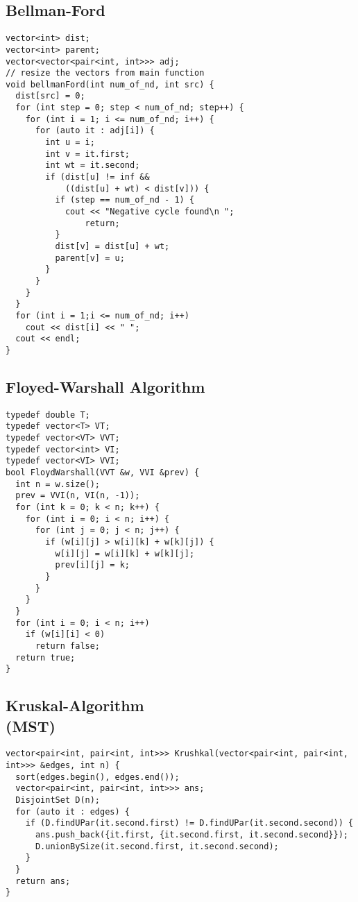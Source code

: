 \documentclass[10pt, a4paper]{article}
\begin{document}
\begin{multicols}{2}
\subsection{Bellman-Ford}
\begin{lstlisting}
vector<int> dist;
vector<int> parent;
vector<vector<pair<int, int>>> adj;
// resize the vectors from main function
void bellmanFord(int num_of_nd, int src) {
  dist[src] = 0;
  for (int step = 0; step < num_of_nd; step++) {
    for (int i = 1; i <= num_of_nd; i++) {
      for (auto it : adj[i]) {
        int u = i;
        int v = it.first;
        int wt = it.second;
        if (dist[u] != inf &&
            ((dist[u] + wt) < dist[v])) {
          if (step == num_of_nd - 1) {
            cout << "Negative cycle found\n ";
                return;
          }
          dist[v] = dist[u] + wt;
          parent[v] = u;
        }
      }
    }
  }
  for (int i = 1;i <= num_of_nd; i++)
    cout << dist[i] << " ";
  cout << endl;
}
\end{lstlisting}
\subsection{Floyed-Warshall Algorithm}
\begin{lstlisting}
typedef double T;
typedef vector<T> VT;
typedef vector<VT> VVT;
typedef vector<int> VI;
typedef vector<VI> VVI;
bool FloydWarshall(VVT &w, VVI &prev) {
  int n = w.size();
  prev = VVI(n, VI(n, -1));
  for (int k = 0; k < n; k++) {
    for (int i = 0; i < n; i++) {
      for (int j = 0; j < n; j++) {
        if (w[i][j] > w[i][k] + w[k][j]) {
          w[i][j] = w[i][k] + w[k][j];
          prev[i][j] = k;
        }
      }
    }
  }
  for (int i = 0; i < n; i++)
    if (w[i][i] < 0)
      return false;
  return true;
}
\end{lstlisting}
\subsection{Kruskal-Algorithm\\(MST)}
\begin{lstlisting}
vector<pair<int, pair<int, int>>> Krushkal(vector<pair<int, pair<int, int>>> &edges, int n) {
  sort(edges.begin(), edges.end());
  vector<pair<int, pair<int, int>>> ans;
  DisjointSet D(n);
  for (auto it : edges) {
    if (D.findUPar(it.second.first) != D.findUPar(it.second.second)) {
      ans.push_back({it.first, {it.second.first, it.second.second}});
      D.unionBySize(it.second.first, it.second.second);
    }
  }
  return ans;
}
\end{lstlisting}

\end{multicols}
\end{document}
